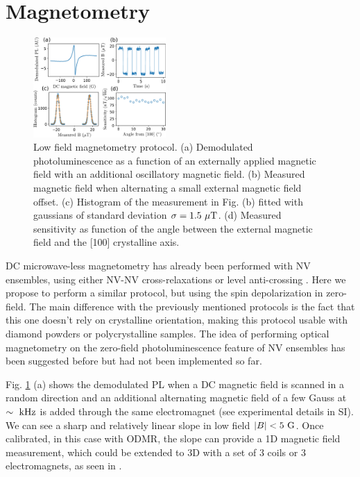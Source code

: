 \documentclass[preprintnumbers,amsmath,amssymb,superscriptaddress,twocolumn,showpacs]{revtex4-2}
\begin{document}
\section*{Magnetometry}
\begin{figure}
\includegraphics[width=0.45\textwidth]{Figures/fig_magneto}
\caption{Low field magnetometry protocol. (a) Demodulated photoluminescence as a function of an externally applied magnetic field with an additional oscillatory magnetic field. (b) Measured magnetic field when alternating a small external magnetic field offset. (c) Histogram of the measurement in Fig. (b) fitted with gaussians of standard deviation $\sigma=1.5\ \mu \rm T$. (d) Measured sensitivity as function of the angle between the external magnetic field and the [100] crystalline axis.}
\label{magneto}
\end{figure}
%
DC microwave-less magnetometry has already been performed with NV ensembles, using either NV-NV cross-relaxations \citep{akhmedzhanov_microwave-free_2017,akhmedzhanov_magnetometry_2019} or level anti-crossing \citep{Wickenbrock, zheng2017level, zheng_microwave-free_2020}. Here we propose to perform a similar protocol, but using the spin depolarization in zero-field. The main difference with the previously mentioned protocols is the fact that this one doesn't rely on crystalline orientation, making this protocol usable with diamond powders or polycrystalline samples. The idea of performing optical magnetometry on the zero-field photoluminescence feature of NV ensembles has been suggested before \cite{filimonenko2018weak, filimonenko2022manifestation} but had not been implemented so far.

Fig. \ref{magneto} (a) shows the demodulated PL when a DC magnetic field is scanned in a random direction and an additional alternating magnetic field of a few Gauss at $\sim \ \rm kHz$ is added through the same electromagnet (see experimental details in SI). We can see a sharp and relatively linear slope in low field $\abs{B} < 5\ \rm G$. Once calibrated, in this case with ODMR, the slope can provide a 1D magnetic field measurement, which could be extended to 3D with a set of 3 coils or 3 electromagnets, as seen in \cite{zheng_microwave-free_2020}.
\end{document}
